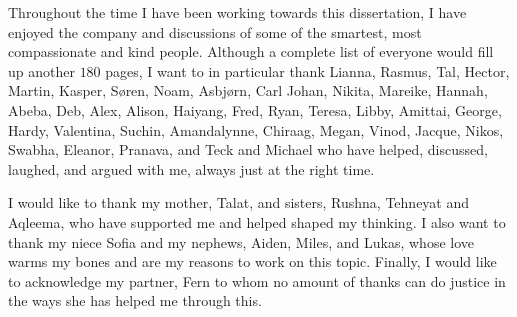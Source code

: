 \begin{acknowledgements}

Throughout the time I have been working towards this dissertation, I have enjoyed the company and discussions of some of the smartest, most compassionate and kind people.
Although a complete list of everyone would fill up another $180$ pages, I want to in particular thank Lianna, Rasmus, Tal, Hector, Martin, Kasper, Søren, Noam, Asbjørn, Carl Johan, Nikita, Mareike, Hannah, Abeba, Deb, Alex, Alison, Haiyang, Fred, Ryan, Teresa, Libby, Amittai, George, Hardy, Valentina, Suchin, Amandalynne, Chiraag, Megan, Vinod, Jacque, Nikos, Swabha, Eleanor, Pranava, and Teck and Michael who have helped, discussed, laughed, and argued with me, always just at the right time.

I would like to thank my mother, Talat, and sisters, Rushna, Tehneyat and Aqleema, who have supported me and helped shaped my thinking. I also want to thank my niece Sofia and my nephews, Aiden, Miles, and Lukas, whose love warms my bones and are my reasons to work on this topic.
Finally, I would like to acknowledge my partner, Fern to whom no amount of thanks can do justice in the ways she has helped me through this.
\end{acknowledgements}

